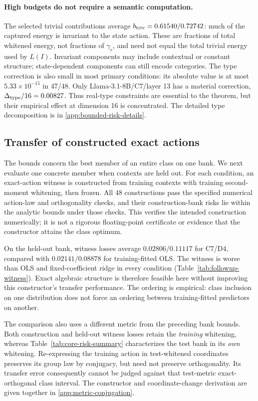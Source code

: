 \paragraph{High budgets do not require a semantic computation.}
The selected trivial contributions average $b_{\rm triv}=0.61540/0.72742$: much of the captured energy is invariant to the state action. These are fractions of total whitened energy, not fractions of $\gamma_r$, and need not equal the total trivial energy used by $L(I)$. Invariant components may include contextual or constant structure; state-dependent components can still encode categories. The type correction is also small in most primary conditions: its absolute value is at most $5.33\times10^{-15}$ in 47/48. Only Llama-3.1-8B/C7/layer 13 has a material correction, $\Delta_{\rm type}/16=0.00827$. Thus real-type constraints are essential to the theorem, but their empirical effect at dimension 16 is concentrated. The detailed type decomposition is in \cref{app:bounded-risk-details}.

\subsection{Transfer of constructed exact actions}
\label{sec:witness-transfer}

The bounds concern the best member of an entire class on one bank. We next evaluate one concrete member when contexts are held out. For each condition, an exact-action witness is constructed from training contexts with training second-moment whitening, then frozen. All 48 constructions pass the specified numerical action-law and orthogonality checks, and their construction-bank risks lie within the analytic bounds under those checks. This verifies the intended construction numerically; it is not a rigorous floating-point certificate or evidence that the constructor attains the class optimum.

On the held-out bank, witness losses average $0.02806/0.11117$ for C7/D4, compared with $0.02141/0.08878$ for training-fitted OLS. The witness is worse than OLS and fixed-coefficient ridge in every condition (Table~\ref{tab:followup-witness}). Exact algebraic structure is therefore feasible here without improving this constructor's transfer performance. The ordering is empirical: class inclusion on one distribution does not force an ordering between training-fitted predictors on another.

The comparison also uses a different metric from the preceding bank bounds. Both construction and held-out witness losses retain the \emph{training} whitening, whereas Table~\ref{tab:core-risk-summary} characterizes the test bank in its \emph{own} whitening. Re-expressing the training action in test-whitened coordinates preserves its group law by conjugacy, but need not preserve orthogonality. Its transfer error consequently cannot be judged against that test-metric exact-orthogonal class interval. The constructor and coordinate-change derivation are given together in \cref{app:metric-conjugation}.

